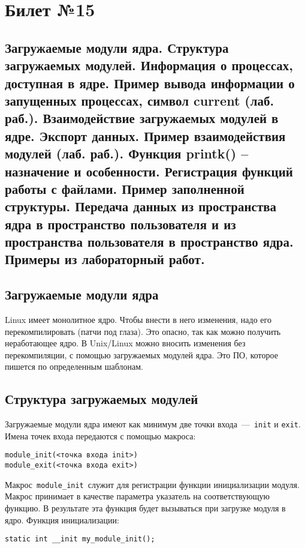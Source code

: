\chapter{Билет №15}

\section*{Загружаемые модули ядра. Структура загружаемых модулей. Информация о процессах, доступная в ядре. Пример вывода информации о запущенных процессах, символ current (лаб. раб.). Взаимодействие загружаемых модулей в ядре. Экспорт данных. Пример взаимодействия модулей (лаб. раб.). Функция printk() – назначение и особенности. Регистрация функций работы с файлами. Пример заполненной структуры. Передача данных из пространства ядра в пространство пользователя и из пространства пользователя в пространство ядра. Примеры из лабораторный работ.}

\section{Загружаемые модули ядра}
Linux имеет монолитное ядро. Чтобы внести в него изменения, надо его перекомпилировать (патчи под глаза). Это опасно, так как можно получить неработающее ядро. В Unix/Linux можно вносить изменения без перекомпиляции, с помощью загружаемых модулей ядра. Это ПО, которое пишется по определенным шаблонам.

\section{Структура загружаемых модулей}

Загружаемые модули ядра имеют как минимум две точки входа~---~\texttt{init} и \texttt{exit}. Имена точек входа передаются с помощью макроса:

\begin{lstlisting}
module_init(<точка входа init>)
module_exit(<точка входа exit>)
\end{lstlisting}

Макрос \texttt{module\_init} служит для регистрации функции инициализации модуля. Макрос принимает в качестве параметра указатель на соответствующую функцию. В результате эта функция будет вызываться при загрузке модуля в ядро. Функция инициализации:

\begin{lstlisting}
static int __init my_module_init();
\end{lstlisting}

